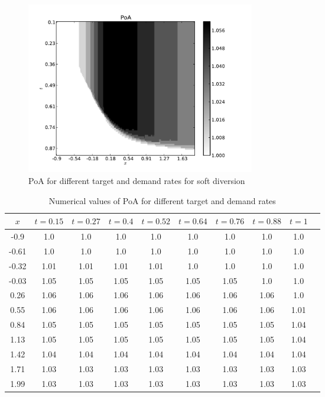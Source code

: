 \documentclass{article}
\begin{document}
\begin{figure}[!htbp]
\begin{center}
\includegraphics[width=10cm]{./Images/model2targetvdemand.pdf}
\caption{PoA for different target and demand rates for soft diversion} \label{Fig:target_demand_model2}
\end{center}
\end{figure}

\begin{table}[!htbp]
\begin{center}
\begin{tabular}{c|ccccccccc}
\toprule
$x$&$t=0.15$&$t=0.27$&$t=0.4$&$t=0.52$&$t=0.64$&$t=0.76$&$t=0.88$&$t=1$\\
\midrule
-0.9&1.0&1.0&1.0&1.0&1.0&1.0&1.0&1.0\\
-0.61&1.0&1.0&1.0&1.0&1.0&1.0&1.0&1.0\\
-0.32&1.01&1.01&1.01&1.01&1.0&1.0&1.0&1.0\\
-0.03&1.05&1.05&1.05&1.05&1.05&1.05&1.0&1.0\\
0.26&1.06&1.06&1.06&1.06&1.06&1.06&1.06&1.0\\
0.55&1.06&1.06&1.06&1.06&1.06&1.06&1.06&1.01\\
0.84&1.05&1.05&1.05&1.05&1.05&1.05&1.05&1.04\\
1.13&1.05&1.05&1.05&1.05&1.05&1.05&1.05&1.04\\
1.42&1.04&1.04&1.04&1.04&1.04&1.04&1.04&1.04\\
1.71&1.03&1.03&1.03&1.03&1.03&1.03&1.03&1.03\\
1.99&1.03&1.03&1.03&1.03&1.03&1.03&1.03&1.03\\
\bottomrule
\end{tabular}
\end{center}
\caption{Numerical values of PoA for different target and demand rates}\label{tabletargetdemandm2}
\end{table}
\end{document}
